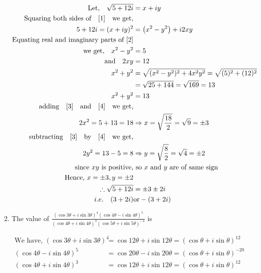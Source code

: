 \begin{enumerate}[label=\color{ocre}\textbf{\arabic*.}]
\begin{answer}
\begin{align}
\text{Let,}\quad \sqrt{5+12 i}&=x+i y \label{1}\\
\text{Squaring both sides of\quad \ref{1}}\quad \text{we get,}\notag\\
5+12 i=(x+i y)^{2}&=\left(x^{2}-y^{2}\right)+i 2 x y \label{2}\\
\text{Equating real and imaginary parts of \ref{2}}\notag\\
\text{we get,}\quad x^{2}-y^{2}&=5\label{3}\\
\text{and}\quad
2 x y &=12 \notag\\
x^{2}+y^{2} &=\sqrt{{({x^{2}-y^{2}})^{2}} +{4{x^{2}y^{2}}}}=\sqrt{(5)^{2}+(12)^{2}}\notag\\
&=\sqrt{25+144}=\sqrt{169}=13 \\
x^{2}+y^{2} &=13\label{4}\\
\text{adding}\quad\ref{3} \quad\text{and}\quad\ref{4}\quad\text{we get,}\notag\\
2 x^{2}=5+13=18 &\Rightarrow x=\sqrt{\frac{18}{2}}=\sqrt{9}=\pm 3\\
\text{subtracting}\quad\ref{3} \quad\text{by}\quad\ref{4}\quad\text{we get,}\notag\\
2 y^{2}=13-5=8 &\Rightarrow y=\sqrt{\frac{8}{2}}=\sqrt{4}=\pm 2\\
\text{since $ xy$ is positive,}&\text{ so $x$ and $y$ are of same sign}\notag \\
\text{Hence, $x=\pm 3, y=\pm 2$}\notag\\\therefore \sqrt{5+12 i}&=\pm 3 \pm 2 i \notag\\ i.e. \quad(3+2 i) &\text{or} -(3+2 i)\notag
\end{align}
\end{answer}
\item The value of $\frac{(\cos 3 \theta+i \sin 3 \theta)^{4}(\cos 4 \theta-i \sin 4 \theta)^{5}}{(\cos 4 \theta+i \sin 4 \theta)^{3}(\cos 5 \theta+i \sin 5 \theta)^{-4}}$ is
\begin{answer}
\begin{align*}
\text{We have, }
(\cos 3 \theta+i \sin 3 \theta)^{4}&=\cos 12 \theta+i \sin 12 \theta=(\cos \theta+i \sin \theta)^{12}\\
(\cos 4 \theta-i \sin 4 \theta)^{5}&=\cos 20 \theta-i \sin 20 \theta=(\cos \theta+i \sin \theta)^{-20} \\
(\cos 4 \theta+i \sin 4 \theta)^{3}&=\cos 12 \theta+i \sin 12 \theta=(\cos \theta+i \sin \theta)^{12}\\

\end{align*}
\end{answer}
\end{enumerate}
